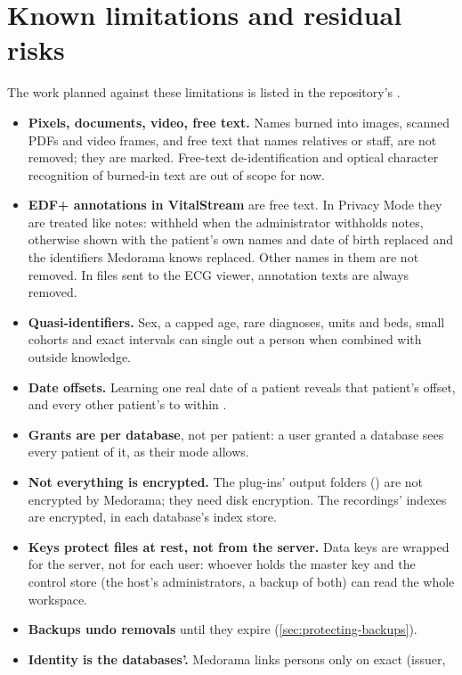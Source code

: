 \section{Known limitations and residual risks}
\label{sec:security-limitations}

The work planned against these limitations is listed in the repository's .
\begin{itemize}
\item \textbf{Pixels, documents, video, free text.} Names burned into images, scanned PDFs and
  video frames, and free text that names relatives or staff, are not removed; they are marked.
  Free-text de-identification and optical character recognition of burned-in text are out of
  scope for now.
\item \textbf{EDF+ annotations in VitalStream} are free text. In Privacy Mode they are treated
  like notes: withheld when the administrator withholds notes, otherwise shown with the patient's
  own names and date of birth replaced and the identifiers Medorama knows replaced. Other
  names in them are not removed. In files sent to the ECG viewer, annotation texts are always
  removed.
\item \textbf{Quasi-identifiers.} Sex, a capped age, rare diagnoses, units and beds, small cohorts
  and exact intervals can single out a person when combined with outside knowledge.
\item \textbf{Date offsets.} Learning one real date of a patient reveals that patient's offset,
  and every other patient's to within .
\item \textbf{Grants are per database}, not per patient: a user granted a database sees every
  patient of it, as their mode allows.
\item \textbf{Not everything is encrypted.} The plug-ins' output folders
  () are not encrypted by Medorama; they need disk encryption.
  The recordings' indexes are encrypted, in each database's index store.
\item \textbf{Keys protect files at rest, not from the server.} Data keys are wrapped for the
  server, not for each user: whoever holds the master key and the control store (the host's
  administrators, a backup of both) can read the whole workspace.
\item \textbf{Backups undo removals} until they expire (\cref{sec:protecting-backups}).
\item \textbf{Identity is the databases'.} Medorama links persons only on exact (issuer,

\end{itemize}
